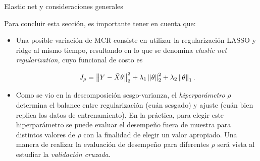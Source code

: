 \documentclass[handout, 9pt]{beamer}
\begin{document}
\begin{frame}{Elastic net y consideraciones generales}

Para concluir esta sección, es importante tener en cuenta que:

\begin{itemize}
	\item Una posible variación de MCR consiste en utilizar la regularización LASSO y ridge al mismo tiempo, resultando en lo que se denomina \emph{elastic net regularization}, cuyo funcional de costo es

\begin{equation*}
	J_\rho = \left\lVert Y-\tilde{X}\theta\right\rVert_2^2 + \lambda_1\left\lVert\theta\right\rVert_2^2 + \lambda_2\left\lVert\theta\right\rVert_1.
\end{equation*} \pause

	\item Como se vio en la descomposición sesgo-varianza, el \emph{hiperparámetro} $\rho$ determina el balance entre regularización (cuán  sesgado) y ajuste (cuán bien replica  los datos de entrenamiento). En la práctica, para elegir este hiperparámetro se puede evaluar el desempeño fuera de muestra para distintos valores de $\rho$ con la finalidad de elegir un valor apropiado. Una manera de realizar la evaluación de desempeño para diferentes $\rho$ será vista al estudiar la \emph{validación cruzada}.
\end{itemize}

	
\end{frame}
\end{document}
